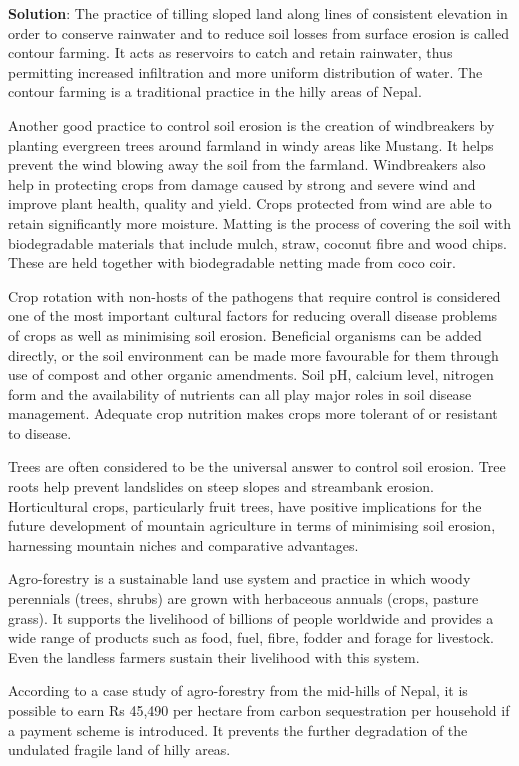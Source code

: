 \documentclass[
  openany]{book}
\newenvironment{solution}{ {\bfseries Solution}:}{}
\begin{document}
\begin{questions}
\begin{solution}
The practice of tilling sloped land along lines of consistent elevation in order to conserve rainwater and to reduce soil losses from surface erosion is called contour farming. It acts as reservoirs to catch and retain rainwater, thus permitting increased infiltration and more uniform distribution of water. The contour farming is a traditional practice in the hilly areas of Nepal.

Another good practice to control soil erosion is the creation of windbreakers by planting evergreen trees around farmland in windy areas like Mustang. It helps prevent the wind blowing away the soil from the farmland. Windbreakers also help in protecting crops from damage caused by strong and severe wind and improve plant health, quality and yield. Crops protected from wind are able to retain significantly more moisture. Matting is the process of covering the soil with biodegradable materials that include mulch, straw, coconut fibre and wood chips. These are held together with biodegradable netting made from coco coir.

Crop rotation with non-hosts of the pathogens that require control is considered one of the most important cultural factors for reducing overall disease problems of crops as well as minimising soil erosion. Beneficial organisms can be added directly, or the soil environment can be made more favourable for them through use of compost and other organic amendments. Soil pH, calcium level, nitrogen form and the availability of nutrients can all play major roles in soil disease management. Adequate crop nutrition makes crops more tolerant of or resistant to disease.

Trees are often considered to be the universal answer to control soil erosion. Tree roots help prevent landslides on steep slopes and streambank erosion. Horticultural crops, particularly fruit trees, have positive implications for the future development of mountain agriculture in terms of minimising soil erosion, harnessing mountain niches and comparative advantages.

Agro-forestry is a sustainable land use system and practice in which woody perennials (trees, shrubs) are grown with herbaceous annuals (crops, pasture grass). It supports the livelihood of billions of people worldwide and provides a wide range of products such as food, fuel, fibre, fodder and forage for livestock. Even the landless farmers sustain their livelihood with this system.

According to a case study of agro-forestry from the mid-hills of Nepal, it is possible to earn Rs 45,490 per hectare from carbon sequestration per household if a payment scheme is introduced. It prevents the further degradation of the undulated fragile land of hilly areas.


\end{solution}
\end{questions}
\end{document}
